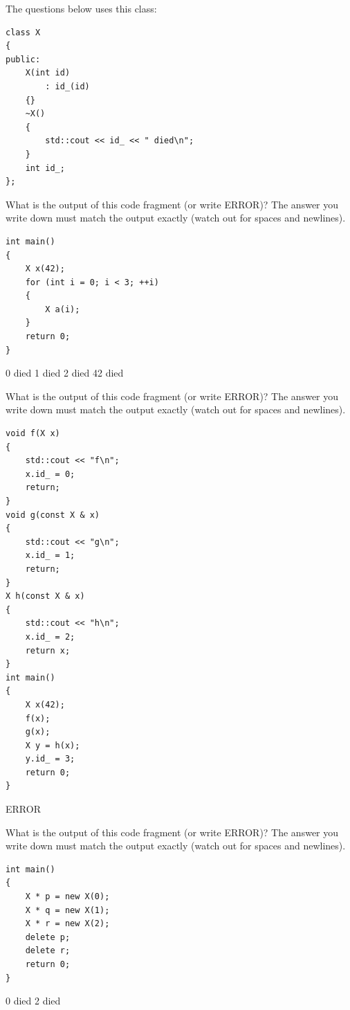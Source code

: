 

The questions below uses this class:
\begin{Verbatim}[frame=single,fontsize=\footnotesize,commandchars=\#\!\@]
class X
{
public:
    X(int id)
        : id_(id)
    {}
    ~X()
    {
        std::cout << id_ << " died\n";
    }
    int id_;
};
\end{Verbatim}

\nextq
What is the output of this code fragment (or write ERROR)?
The answer you write down must match the output exactly (watch out for
spaces and newlines).
\begin{Verbatim}[frame=single,fontsize=\footnotesize]
int main()
{
    X x(42);
    for (int i = 0; i < 3; ++i)
    {
        X a(i);
    }
    return 0;
}
\end{Verbatim}
\ANSWER
\begin{answercode}
0 died
1 died
2 died
42 died
\end{answercode}

\nextq
What is the output of this code fragment (or write ERROR)?
The answer you write down must match the output exactly (watch out for
spaces and newlines).
\begin{Verbatim}[frame=single,fontsize=\footnotesize]
void f(X x)
{
    std::cout << "f\n";
    x.id_ = 0;
    return;
}
void g(const X & x)
{
    std::cout << "g\n";
    x.id_ = 1;
    return;
}
X h(const X & x)
{
    std::cout << "h\n";
    x.id_ = 2;
    return x;
}
int main()
{
    X x(42);
    f(x);
    g(x);
    X y = h(x);
    y.id_ = 3;
    return 0;
}
\end{Verbatim}
\ANSWER
\begin{answercode}
ERROR
\end{answercode}

\nextq
What is the output of this code fragment (or write ERROR)?
The answer you write down must match the output exactly (watch out for
spaces and newlines).
\begin{Verbatim}[frame=single,fontsize=\footnotesize]
int main()
{
    X * p = new X(0);
    X * q = new X(1);
    X * r = new X(2);
    delete p;
    delete r;
    return 0;
}
\end{Verbatim}
\ANSWER
\begin{answercode}
0 died
2 died
\end{answercode}


